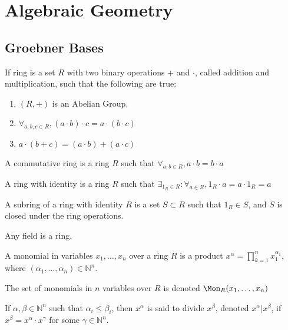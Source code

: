 \documentclass[crop=false,class=article,oneside]{standalone}
\begin{document}
    \ifx\ifgeoalg\undefined
        \section*{Algebraic Geometry}
        \setcounter{section}{1}
    \fi
\subsection{Groebner Bases}
    \begin{definition}
    If ring is a set $R$ with two binary operations $+$ and $\cdot$, called addition and multiplication, such that the following are true:
    \begin{enumerate}
        \item $(R,+)$ is an Abelian Group.
        \item $\forall_{a,b,c\in R}, (a\cdot b)\cdot c = a\cdot(b\cdot c)$
        \item $a\cdot(b+c) = (a\cdot b)+(a\cdot c)$
    \end{enumerate}
    \end{definition}
    \begin{definition}
    A commutative ring is a ring $R$ such that $\forall_{a,b\in R}, a\cdot b=b\cdot a$
    \end{definition}
    \begin{definition}
    A ring with identity is a ring $R$ such that $\exists_{1_{R}\in R}:\forall_{a\in R}, 1_{R}\cdot a=a\cdot 1_{R}=a$
    \end{definition}
    \begin{definition}
    A subring of a ring with identity $R$ is a set $S\subset R$ such that $1_{R}\in S$, and $S$ is closed under the ring operations.
    \end{definition}
    \begin{remark}
    Any field is a ring.
    \end{remark}
    \begin{definition}
    A monomial in variables $x_1,\hdots, x_n$ over a ring $R$ is a product $x^\alpha = \prod_{k=1}^{n} x_1^{\alpha_1}$, where $(\alpha_1,\hdots, \alpha_n)\in \mathbb{N}^n$.
    \end{definition}
    \begin{notation}
    The set of monomials in $n$ variables over $R$ is denoted $\Mon_{R}(x_1,\hdots, x_n)$
    \end{notation}
    \begin{definition}
    If $\alpha,\beta \in \mathbb{N}^n$ such that $\alpha_i \leq \beta_i$, then $x^{\alpha}$ is said to divide $x^\beta$, denoted $x^\alpha \vert x^\beta$, if $x^\beta = x^\alpha \cdot x^\gamma$ for some $\gamma \in \mathbb{N}^n$.
    \end{definition}
\end{document}
